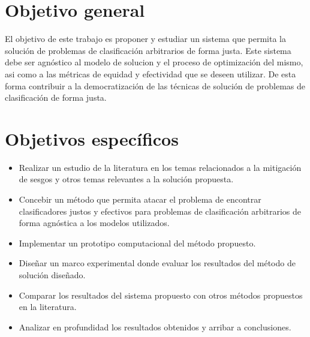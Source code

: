 \section*{Objetivo general}

El objetivo de este trabajo es proponer y estudiar un sistema que permita la solución de problemas de clasificación arbitrarios de forma justa.
Este sistema debe ser agnóstico al modelo de solucion y el proceso de optimización del mismo, asi como a las métricas de equidad y efectividad que se deseen utilizar.
De esta forma contribuir a la democratización de las técnicas de solución de problemas de clasificación de forma justa.

\section*{Objetivos específicos}

\begin{itemize}
    \item Realizar un estudio de la literatura en los temas relacionados a la mitigación de sesgos y otros temas relevantes a la solución propuesta.
    \item Concebir un método que permita atacar el problema de encontrar clasificadores justos y efectivos para problemas de clasificación arbitrarios de forma agnóstica a los modelos utilizados.
    \item Implementar un prototipo computacional del método propuesto.
    \item Diseñar un marco experimental donde evaluar los resultados del método de solución diseñado.
    \item Comparar los resultados del sistema propuesto con otros métodos propuestos en la literatura.
    \item Analizar en profundidad los resultados obtenidos y arribar a conclusiones.
\end{itemize}

